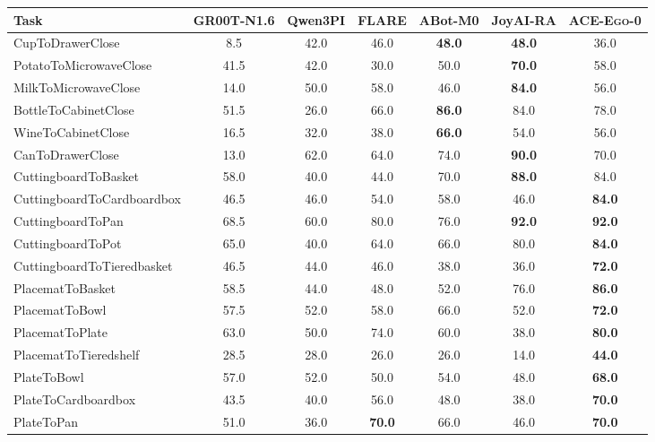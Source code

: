 \documentclass{llmxive}
\providecommand{\OURS}{\textsc{ACE-Ego-0}\xspace}
\providecommand{\Ours}{\OURS}
\providecommand{\arraystretch}{1.1}
\begin{document}
\begin{table}[tp]
\centering
\vspace{0.3em}
\small
\renewcommand{\arraystretch}{1.1}
\setlength{\tabcolsep}{4pt}
\begin{tabular*}{\textwidth}{@{\extracolsep{\fill}}lcccccc}
\hline
\textbf{Task} & GR00T-N1.6 & Qwen3PI & FLARE & ABot-M0 & JoyAI-RA & \Ours \\
\hline
CupToDrawerClose           &  8.5 & 42.0 & 46.0 & \textbf{48.0} & \textbf{48.0} & 36.0 \\
PotatoToMicrowaveClose     & 41.5 & 42.0 & 30.0 & 50.0 & \textbf{70.0} & 58.0 \\
MilkToMicrowaveClose       & 14.0 & 50.0 & 58.0 & 46.0 & \textbf{84.0} & 56.0 \\
BottleToCabinetClose       & 51.5 & 26.0 & 66.0 & \textbf{86.0} & 84.0 & 78.0 \\
WineToCabinetClose         & 16.5 & 32.0 & 38.0 & \textbf{66.0} & 54.0 & 56.0 \\
CanToDrawerClose           & 13.0 & 62.0 & 64.0 & 74.0 & \textbf{90.0} & 70.0 \\
\hline
CuttingboardToBasket       & 58.0 & 40.0 & 44.0 & 70.0 & \textbf{88.0} & 84.0 \\
CuttingboardToCardboardbox & 46.5 & 46.0 & 54.0 & 58.0 & 46.0 & \textbf{84.0} \\
CuttingboardToPan          & 68.5 & 60.0 & 80.0 & 76.0 & \textbf{92.0} & \textbf{92.0} \\
CuttingboardToPot          & 65.0 & 40.0 & 64.0 & 66.0 & 80.0 & \textbf{84.0} \\
CuttingboardToTieredbasket & 46.5 & 44.0 & 46.0 & 38.0 & 36.0 & \textbf{72.0} \\
\hline
PlacematToBasket           & 58.5 & 44.0 & 48.0 & 52.0 & 76.0 & \textbf{86.0} \\
PlacematToBowl             & 57.5 & 52.0 & 58.0 & 66.0 & 52.0 & \textbf{72.0} \\
PlacematToPlate            & 63.0 & 50.0 & 74.0 & 60.0 & 38.0 & \textbf{80.0} \\
PlacematToTieredshelf      & 28.5 & 28.0 & 26.0 & 26.0 & 14.0 & \textbf{44.0} \\
\hline
PlateToBowl                & 57.0 & 52.0 & 50.0 & 54.0 & 48.0 & \textbf{68.0} \\
PlateToCardboardbox        & 43.5 & 40.0 & 56.0 & 48.0 & 38.0 & \textbf{70.0} \\
PlateToPan                 & 51.0 & 36.0 & \textbf{70.0} & 66.0 & 46.0 & \textbf{70.0} \\

\end{tabular*}
\end{table}
\end{document}
